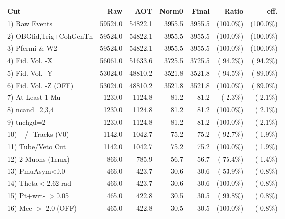  \begin{table}[h!]\centering
 \begin{tabular}{||l||r|r|r|r|r|r||}
 \hline
 \hline
 Cut & Raw & AOT & Norm0 & Final & Ratio & eff.       \\
 \hline
  1) Raw Events           &      59524.0 &      54822.1 &       3955.5 &       3955.5 & (100.0\%) & (100.0\%) \\
  2) OBGfid,Trig+CohGenTh &      59524.0 &      54822.1 &       3955.5 &       3955.5 & (100.0\%) & (100.0\%) \\
  3) Pfermi \& W2         &      59524.0 &      54822.1 &       3955.5 &       3955.5 & (100.0\%) & (100.0\%) \\
  4) Fid. Vol. -X         &      56061.0 &      51633.6 &       3725.5 &       3725.5 & ( 94.2\%) & ( 94.2\%) \\
  5) Fid. Vol. -Y         &      53024.0 &      48810.2 &       3521.8 &       3521.8 & ( 94.5\%) & ( 89.0\%) \\
  6) Fid. Vol. -Z (OFF)   &      53024.0 &      48810.2 &       3521.8 &       3521.8 & (100.0\%) & ( 89.0\%) \\
  7) At Least 1 Mu        &       1230.0 &       1124.8 &         81.2 &         81.2 & (  2.3\%) & (  2.1\%) \\
  8) ncand=2,3,4          &       1230.0 &       1124.8 &         81.2 &         81.2 & (100.0\%) & (  2.1\%) \\
  9) tnchgd=2             &       1230.0 &       1124.8 &         81.2 &         81.2 & (100.0\%) & (  2.1\%) \\
 10) +/- Tracks (V0)      &       1142.0 &       1042.7 &         75.2 &         75.2 & ( 92.7\%) & (  1.9\%) \\
 11) Tube/Veto Cut        &       1142.0 &       1042.7 &         75.2 &         75.2 & (100.0\%) & (  1.9\%) \\
 12) 2 Muons (1mux)       &        866.0 &        785.9 &         56.7 &         56.7 & ( 75.4\%) & (  1.4\%) \\
 13) PmuAsym<0.0          &        466.0 &        423.7 &         30.6 &         30.6 & ( 53.9\%) & (  0.8\%) \\
 14) Theta$<$2.62 rad     &        466.0 &        423.7 &         30.6 &         30.6 & (100.0\%) & (  0.8\%) \\
 15) Pt+wrt- $>$0.05      &        465.0 &        422.8 &         30.5 &         30.5 & ( 99.8\%) & (  0.8\%) \\
 16) Mee $>$ 2.0  (OFF)   &        465.0 &        422.8 &         30.5 &         30.5 & (100.0\%) & (  0.8\%) \\

\end{tabular}
\end{table}
